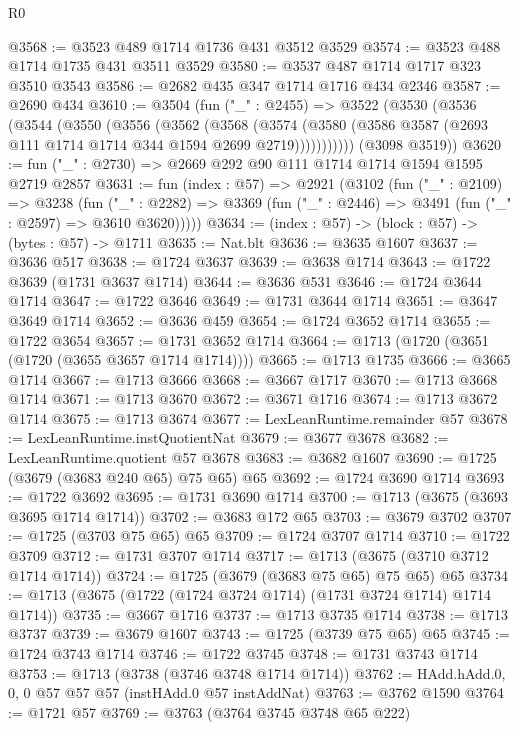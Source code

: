 \begin{lexlean}{R0}
\begin{coremodule}
@3568 := @3523 @489 @1714 @1736 @431 @3512 @3529
@3574 := @3523 @488 @1714 @1735 @431 @3511 @3529
@3580 := @3537 @487 @1714 @1717 @323 @3510 @3543
@3586 := @2682 @435 @347 @1714 @1716 @434 @2346
@3587 := @2690 @434
@3610 := @3504
    (fun ("_" : @2455) =>
    @3522
      (@3530
        (@3536
          (@3544
            (@3550
              (@3556
                (@3562
                  (@3568
                    (@3574
                      (@3580 (@3586 @3587 (@2693 @111 @1714 @1714 @344 @1594 @2699 @2719)))))))))))
      (@3098 @3519))
@3620 := fun ("_" : @2730) => @2669 @292 @90 @111 @1714 @1714 @1594 @1595 @2719 @2857
@3631 := fun (index : @57) =>
  @2921
    (@3102
      (fun ("_" : @2109) =>
      @3238
        (fun ("_" : @2282) =>
        @3369 (fun ("_" : @2446) => @3491 (fun ("_" : @2597) => @3610 @3620)))))
@3634 := (index : @57) -> (block : @57) -> (bytes : @57) -> @1711
@3635 := Nat.blt
@3636 := @3635 @1607
@3637 := @3636 @517
@3638 := @1724 @3637
@3639 := @3638 @1714
@3643 := @1722 @3639 (@1731 @3637 @1714)
@3644 := @3636 @531
@3646 := @1724 @3644 @1714
@3647 := @1722 @3646
@3649 := @1731 @3644 @1714
@3651 := @3647 @3649 @1714
@3652 := @3636 @459
@3654 := @1724 @3652 @1714
@3655 := @1722 @3654
@3657 := @1731 @3652 @1714
@3664 := @1713 (@1720 (@3651 (@1720 (@3655 @3657 @1714 @1714))))
@3665 := @1713 @1735
@3666 := @3665 @1714
@3667 := @1713 @3666
@3668 := @3667 @1717
@3670 := @1713 @3668 @1714
@3671 := @1713 @3670
@3672 := @3671 @1716
@3674 := @1713 @3672 @1714
@3675 := @1713 @3674
@3677 := LexLeanRuntime.remainder @57
@3678 := LexLeanRuntime.instQuotientNat
@3679 := @3677 @3678
@3682 := LexLeanRuntime.quotient @57 @3678
@3683 := @3682 @1607
@3690 := @1725 (@3679 (@3683 @240 @65) @75 @65) @65
@3692 := @1724 @3690 @1714
@3693 := @1722 @3692
@3695 := @1731 @3690 @1714
@3700 := @1713 (@3675 (@3693 @3695 @1714 @1714))
@3702 := @3683 @172 @65
@3703 := @3679 @3702
@3707 := @1725 (@3703 @75 @65) @65
@3709 := @1724 @3707 @1714
@3710 := @1722 @3709
@3712 := @1731 @3707 @1714
@3717 := @1713 (@3675 (@3710 @3712 @1714 @1714))
@3724 := @1725 (@3679 (@3683 @75 @65) @75 @65) @65
@3734 := @1713 (@3675 (@1722 (@1724 @3724 @1714) (@1731 @3724 @1714) @1714 @1714))
@3735 := @3667 @1716
@3737 := @1713 @3735 @1714
@3738 := @1713 @3737
@3739 := @3679 @1607
@3743 := @1725 (@3739 @75 @65) @65
@3745 := @1724 @3743 @1714
@3746 := @1722 @3745
@3748 := @1731 @3743 @1714
@3753 := @1713 (@3738 (@3746 @3748 @1714 @1714))
@3762 := HAdd.hAdd.{0, 0, 0} @57 @57 @57 (instHAdd.{0} @57 instAddNat)
@3763 := @3762 @1590
@3764 := @1721 @57
@3769 := @3763 (@3764 @3745 @3748 @65 @222)

\end{coremodule}
\end{lexlean}
